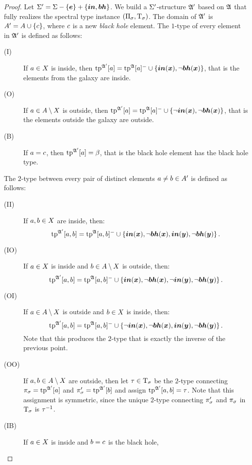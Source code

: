 \begin{proof}
Let $\mathrm{\Sigma'} = \mathrm{\Sigma} - \left\{\bm{e}\right\} + \left\{\bm{in},\bm{bh}\right\}$. We build a $\mathrm{\Sigma'}$-structure
$\mathfrak{A'}$ based on $\mathfrak{A}$ that fully realizes the spectral type instance
$(\Pi_\sigma, \mathrm{T}_\sigma)$. The domain of $\mathfrak{A'}$ is $A' = A \cup
\left\{c\right\}$, where $c$ is a new \emph{black hole} element. The $1$-type of
every element in $\mathfrak{A'}$ is defined as follows:
\begin{description}
  \item[(I)] If $a \in X$ is inside, then $\operatorname{tp}^{\mathfrak{A'}}[a] =
  \operatorname{tp}^{\mathfrak{A}}[a]^{-} \cup \left\{\bm{in}(\bm{x}),\lnot\bm{bh}(\bm{x})\right\}$,
  that is the elements from the galaxy are inside.
  \item[(O)] If $a \in A\setminus X$ is outside, then $\operatorname{tp}^{\mathfrak{A'}}[a] =
  \operatorname{tp}^{\mathfrak{A}}[a]^{-} \cup \left\{\lnot\bm{in}(\bm{x}),\lnot\bm{bh}(\bm{x})\right\}$, that is the
  elements outside the galaxy are outside.
  \item[(B)] If $a = c$, then $\operatorname{tp}^{\mathfrak{A'}}[a] = \beta$, that is the black
  hole element has the black hole type.
\end{description}
The $2$-type between every pair of distinct elements $a \neq b \in A'$
is defined as follows:
\begin{description}
  \item[(II)] If $a,b \in X$ are inside, then:
  \[
    \operatorname{tp}^{\mathfrak{A'}}[a,b] = \operatorname{tp}^{\mathfrak{A}}[a,b]^{-} \cup
    \left\{\bm{in}(\bm{x}),\lnot\bm{bh}(\bm{x}),\bm{in}(\bm{y}),\lnot\bm{bh}(\bm{y})\right\}.
  \]
  \item[(IO)] If $a \in X$ is inside and $b \in A \setminus X$ is
  outside, then:
  \[
    \operatorname{tp}^{\mathfrak{A'}}[a,b] = \operatorname{tp}^{\mathfrak{A}}[a,b]^{-} \cup
    \left\{\bm{in}(\bm{x}),\lnot\bm{bh}(\bm{x}),\lnot\bm{in}(\bm{y}),\lnot\bm{bh}(\bm{y})\right\}.
  \]
  \item[(OI)] If $a \in A \setminus X$ is outside and $b \in X$ is
  inside, then:
  \[
    \operatorname{tp}^{\mathfrak{A'}}[a,b] = \operatorname{tp}^{\mathfrak{A}}[a,b]^{-} \cup
    \left\{\lnot\bm{in}(\bm{x}),\lnot\bm{bh}(\bm{x}),\bm{in}(\bm{y}),\lnot\bm{bh}(\bm{y})\right\}.
  \]
  Note that this produces the $2$-type that is exactly the inverse of the
  previous point.
  \item[(OO)] If $a, b \in A \setminus X$ are outside, then let $\tau
  \in \mathrm{T}_\sigma$ be the $2$-type connecting $\pi_\sigma = \operatorname{tp}^{\mathfrak{A'}}[a]$ and
  $\pi_\sigma' = \operatorname{tp}^{\mathfrak{A'}}[b]$ and assign $\operatorname{tp}^{\mathfrak{A'}}[a,b] = \tau$. Note
  that this assignment is symmetric, since the unique $2$-type connecting
  $\pi_\sigma'$ and $\pi_\sigma$ in $\mathrm{T}_\sigma$ is $\tau^{-1}$.
  \item[(IB)] If $a \in X$ is inside and $b = c$ is the black hole,

\end{description}
\end{proof}

